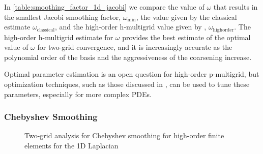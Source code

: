 \documentclass[review]{siamart190516}
\begin{document}
In \cref{table:smoothing_factor_1d_jacobi} we compare the value of $\omega$ that results in the smallest Jacobi smoothing factor, $\omega_{\min}$, the value given by the classical estimate $\omega_{\text{classical}}$, and the high-order h-multigrid value given by \cite{he2020two}, $\omega_{\text{highorder}}$.
The high-order h-multigrid estimate for $\omega$ provides the best estimate of the optimal value of $\omega$ for two-grid convergence, and it is increasingly accurate as the polynomial order of the basis and the aggressiveness of the coarsening increase.

Optimal parameter estimation is an open question for high-order p-multigrid, but optimization techniques, such as those discussed in \cite{brown2021tuning}, can be used to tune these parameters, especially for more complex PDEs.

\subsubsection{Chebyshev Smoothing}

\begin{figure}[!tbp]
  \centering
  \caption{Two-grid analysis for Chebyshev smoothing for high-order finite elements for the 1D Laplacian}
\end{figure}
\end{document}
